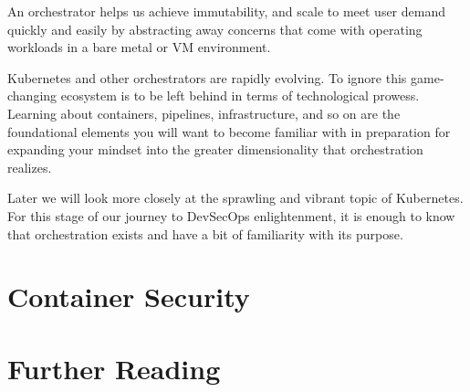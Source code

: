 \justify{}
An orchestrator helps us achieve immutability, and scale
to meet user demand quickly and easily by abstracting away
concerns that come with operating workloads in a bare metal
or VM environment.

\justify{}
Kubernetes and other orchestrators are rapidly evolving. To ignore this
game-changing ecosystem is to be left behind in terms of technological
prowess. Learning about containers, pipelines, infrastructure, and
so on are the foundational elements you will want to become familiar
with in preparation for expanding your mindset into the greater
dimensionality that orchestration realizes.

\justify{}
Later we will look more closely at the sprawling and vibrant 
topic of Kubernetes. For this stage of our journey to DevSecOps
enlightenment, it is enough to know that orchestration exists
and have a bit of familiarity with its purpose.

\section{Container Security} 


\section{Further Reading}
